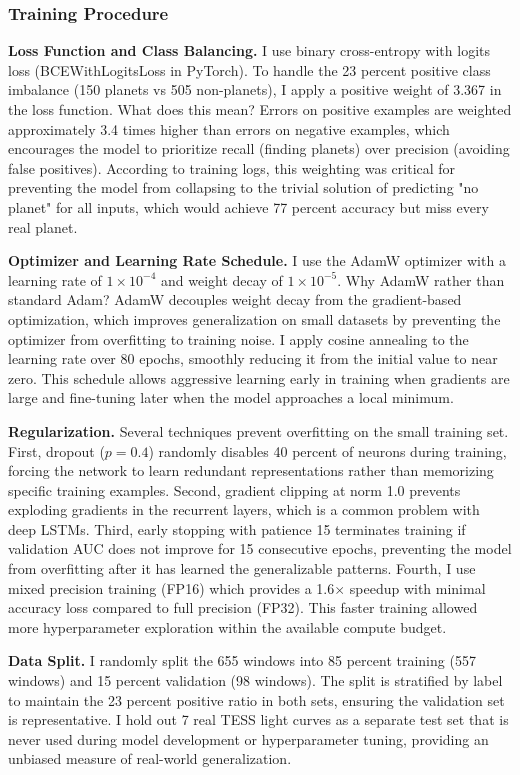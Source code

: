 \documentclass[letterpaper]{article} %
\begin{document}
\subsubsection{Training Procedure}

\textbf{Loss Function and Class Balancing.} I use binary cross-entropy with logits loss (BCEWithLogitsLoss in PyTorch). To handle the 23 percent positive class imbalance (150 planets vs 505 non-planets), I apply a positive weight of 3.367 in the loss function. What does this mean? Errors on positive examples are weighted approximately 3.4 times higher than errors on negative examples, which encourages the model to prioritize recall (finding planets) over precision (avoiding false positives). According to training logs, this weighting was critical for preventing the model from collapsing to the trivial solution of predicting "no planet" for all inputs, which would achieve 77 percent accuracy but miss every real planet.

\textbf{Optimizer and Learning Rate Schedule.} I use the AdamW optimizer with a learning rate of $1 \times 10^{-4}$ and weight decay of $1 \times 10^{-5}$. Why AdamW rather than standard Adam? AdamW decouples weight decay from the gradient-based optimization, which improves generalization on small datasets by preventing the optimizer from overfitting to training noise. I apply cosine annealing to the learning rate over 80 epochs, smoothly reducing it from the initial value to near zero. This schedule allows aggressive learning early in training when gradients are large and fine-tuning later when the model approaches a local minimum.

\textbf{Regularization.} Several techniques prevent overfitting on the small training set. First, dropout ($p=0.4$) randomly disables 40 percent of neurons during training, forcing the network to learn redundant representations rather than memorizing specific training examples. Second, gradient clipping at norm 1.0 prevents exploding gradients in the recurrent layers, which is a common problem with deep LSTMs. Third, early stopping with patience 15 terminates training if validation AUC does not improve for 15 consecutive epochs, preventing the model from overfitting after it has learned the generalizable patterns. Fourth, I use mixed precision training (FP16) which provides a 1.6$\times$ speedup with minimal accuracy loss compared to full precision (FP32). This faster training allowed more hyperparameter exploration within the available compute budget.

\textbf{Data Split.} I randomly split the 655 windows into 85 percent training (557 windows) and 15 percent validation (98 windows). The split is stratified by label to maintain the 23 percent positive ratio in both sets, ensuring the validation set is representative. I hold out 7 real TESS light curves as a separate test set that is never used during model development or hyperparameter tuning, providing an unbiased measure of real-world generalization.
\end{document}

